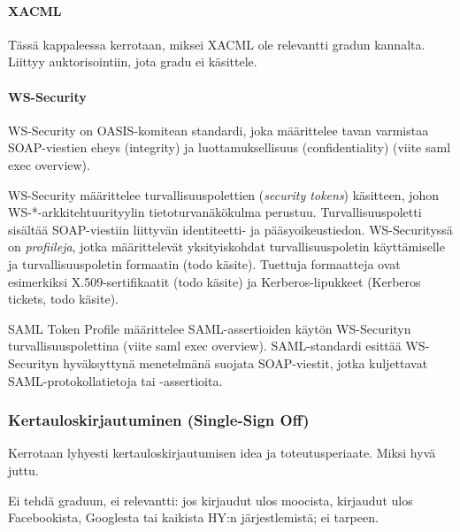 \documentclass[finnish,gradu]{tktltiki}
\begin{document}

  \paragraph{XACML} %
  \label{par:xacml}
  Tässä kappaleessa kerrotaan, miksei XACML ole relevantti gradun kannalta. Liittyy auktorisointiin, jota gradu ei käsittele.


  \paragraph{WS-Security} %
  \label{par:ws_security}
  WS-Security on OASIS-komitean standardi, joka määrittelee tavan varmistaa SOAP-viestien eheys (integrity) ja luottamuksellisuus (confidentiality) (viite saml exec overview).

  WS-Security määrittelee turvallisuuspolettien (\emph{security tokens}) käsitteen, johon WS-*-arkkitehtuurityylin tietoturvanäkökulma perustuu.
  Turvallisuuspoletti sisältää SOAP-viestiin liittyvän identiteetti- ja pääsyoikeustiedon.
  WS-Securityssä on \emph{profiileja}, jotka määrittelevät yksityiskohdat turvallisuuspoletin käyttämiselle ja turvallisuuspoletin formaatin (todo käsite).
  Tuettuja formaatteja ovat esimerkiksi X.509-sertifikaatit (todo käsite) ja Kerberos-lipukkeet (Kerberos tickets, todo käsite).

  SAML Token Profile määrittelee SAML-assertioiden käytön WS-Securityn turvallisuuspolettina (viite saml exec overview).
  SAML-standardi esittää WS-Securityn hyväksyttynä menetelmänä suojata SOAP-viestit, jotka kuljettavat SAML-protokollatietoja tai -assertioita.



  \subsubsection{Kertauloskirjautuminen (Single-Sign Off)} %
  \label{ssub:kertauloskirjautuminen}
  Kerrotaan lyhyesti kertauloskirjautumisen idea ja toteutusperiaate. Miksi hyvä juttu.

  Ei tehdä graduun, ei relevantti: jos kirjaudut ulos moocista, kirjaudut ulos Facebookista, Googlesta tai kaikista HY:n järjestlemistä; ei tarpeen.
\end{document}
